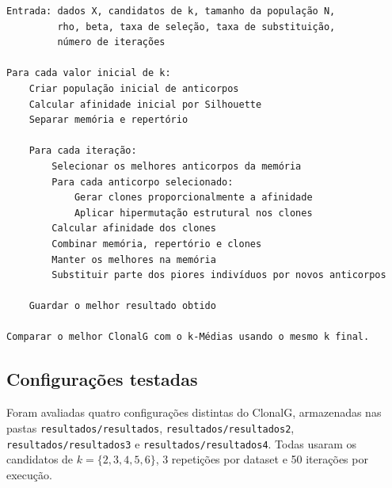 \documentclass[12pt,a4paper]{article}
\begin{document}
\begin{verbatim}
Entrada: dados X, candidatos de k, tamanho da população N,
         rho, beta, taxa de seleção, taxa de substituição,
         número de iterações

Para cada valor inicial de k:
    Criar população inicial de anticorpos
    Calcular afinidade inicial por Silhouette
    Separar memória e repertório

    Para cada iteração:
        Selecionar os melhores anticorpos da memória
        Para cada anticorpo selecionado:
            Gerar clones proporcionalmente a afinidade
            Aplicar hipermutação estrutural nos clones
        Calcular afinidade dos clones
        Combinar memória, repertório e clones
        Manter os melhores na memória
        Substituir parte dos piores indivíduos por novos anticorpos

    Guardar o melhor resultado obtido

Comparar o melhor ClonalG com o k-Médias usando o mesmo k final.
\end{verbatim}

\subsection{Configurações testadas}

Foram avaliadas quatro configurações distintas do ClonalG, armazenadas nas pastas \texttt{resultados/resultados}, \texttt{resultados/resultados2}, \texttt{resultados/resultados3} e \texttt{resultados/resultados4}. Todas usaram os candidatos de \(k = \{2,3,4,5,6\}\), 3 repetições por dataset e 50 iterações por execução.

\begin{table}[H]
\centering
\caption{Configurações comparadas nos experimentos.}
\label{tab:configs}
\end{table}
\end{document}
